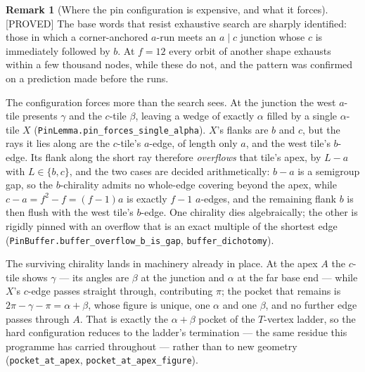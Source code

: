 \documentclass[11pt,reqno]{amsart}
\theoremstyle{plain}
\theoremstyle{definition}
\newtheorem{remark}[theorem]{Remark}
\newcommand{\lab}[1]{\hfill\textnormal{\footnotesize\textsc{[#1]}}}
\begin{document}
\begin{remark}[Where the pin configuration is expensive, and what it forces]\label{rem:pinbuffer}\lab{PROVED}
The base words that resist exhaustive search are sharply identified: those in which a
corner-anchored $a$-run meets an $a\mid c$ junction whose $c$ is immediately followed by $b$. At
$f=12$ every orbit of another shape exhausts within a few thousand nodes, while these do not, and
the pattern was confirmed on a prediction made before the runs.

The configuration forces more than the search sees. At the junction the west $a$-tile presents
$\gamma$ and the $c$-tile $\beta$, leaving a wedge of exactly $\alpha$ filled by a single
$\alpha$-tile $X$ (\texttt{PinLemma.pin\_forces\_single\_alpha}). $X$'s flanks are $b$ and $c$, but the rays it
lies along are the $c$-tile's $a$-edge, of length only $a$, and the west tile's $b$-edge. Its flank
along the short ray therefore \emph{overflows} that tile's apex, by $L-a$ with $L\in\{b,c\}$, and
the two cases are decided arithmetically: $b-a$ is a semigroup gap, so the $b$-chirality admits no
whole-edge covering beyond the apex, while $c-a=f^{2}-f=(f-1)a$ is exactly $f-1$ $a$-edges, and the
remaining flank $b$ is then flush with the west tile's $b$-edge. One chirality dies algebraically;
the other is rigidly pinned with an overflow that is an exact multiple of the shortest edge
(\texttt{PinBuffer.buffer\_overflow\_b\_is\_gap}, \texttt{buffer\_dichotomy}).

The surviving chirality lands in machinery already in place. At the apex $A$ the $c$-tile shows
$\gamma$ --- its angles are $\beta$ at the junction and $\alpha$ at the far base end --- while
$X$'s $c$-edge passes straight through, contributing $\pi$; the pocket that remains is
$2\pi-\gamma-\pi=\alpha+\beta$, whose figure is unique, one $\alpha$ and one $\beta$, and no
further edge passes through $A$. That is exactly the $\alpha+\beta$ pocket of the $T$-vertex
ladder, so the hard configuration reduces to the ladder's termination --- the same residue this
programme has carried throughout --- rather than to new geometry
(\texttt{pocket\_at\_apex}, \texttt{pocket\_at\_apex\_figure}).


\end{remark}
\end{document}
